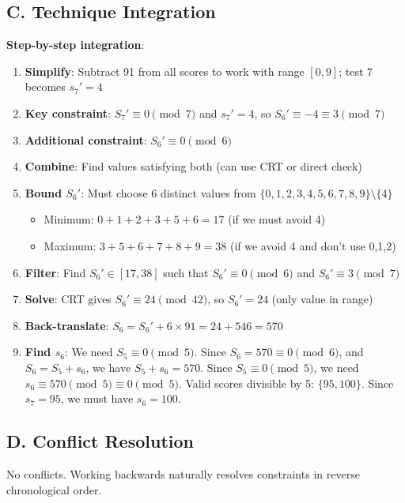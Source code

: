 \documentclass[11pt]{article}
\begin{document}
\begin{techniquesbox}
\subsection*{C. Technique Integration}
\textbf{Step-by-step integration}:
\begin{enumerate}
    \item \textbf{Simplify}: Subtract 91 from all scores to work with range $[0, 9]$; test 7 becomes $s_7' = 4$
    \item \textbf{Key constraint}: $S_7' \equiv 0 \pmod{7}$ and $s_7' = 4$, so $S_6' \equiv -4 \equiv 3 \pmod{7}$
    \item \textbf{Additional constraint}: $S_6' \equiv 0 \pmod{6}$
    \item \textbf{Combine}: Find values satisfying both (can use CRT or direct check)
    \item \textbf{Bound $S_6'$}: Must choose 6 distinct values from $\{0, 1, 2, 3, 4, 5, 6, 7, 8, 9\} \setminus \{4\}$
    \begin{itemize}
        \item Minimum: $0+1+2+3+5+6 = 17$ (if we must avoid 4)
        \item Maximum: $3+5+6+7+8+9 = 38$ (if we avoid 4 and don't use 0,1,2)
    \end{itemize}
    \item \textbf{Filter}: Find $S_6' \in [17, 38]$ such that $S_6' \equiv 0 \pmod{6}$ and $S_6' \equiv 3 \pmod{7}$
    \item \textbf{Solve}: CRT gives $S_6' \equiv 24 \pmod{42}$, so $S_6' = 24$ (only value in range)
    \item \textbf{Back-translate}: $S_6 = S_6' + 6 \times 91 = 24 + 546 = 570$
    \item \textbf{Find $s_6$}: We need $S_5 \equiv 0 \pmod{5}$. Since $S_6 = 570 \equiv 0 \pmod{6}$, and $S_6 = S_5 + s_6$, we have $S_5 + s_6 = 570$. Since $S_5 \equiv 0 \pmod{5}$, we need $s_6 \equiv 570 \pmod{5} \equiv 0 \pmod{5}$. Valid scores divisible by 5: $\{95, 100\}$. Since $s_7 = 95$, we must have $s_6 = 100$.
\end{enumerate}

\subsection*{D. Conflict Resolution}
No conflicts. Working backwards naturally resolves constraints in reverse chronological order.
\end{techniquesbox}
\end{document}
